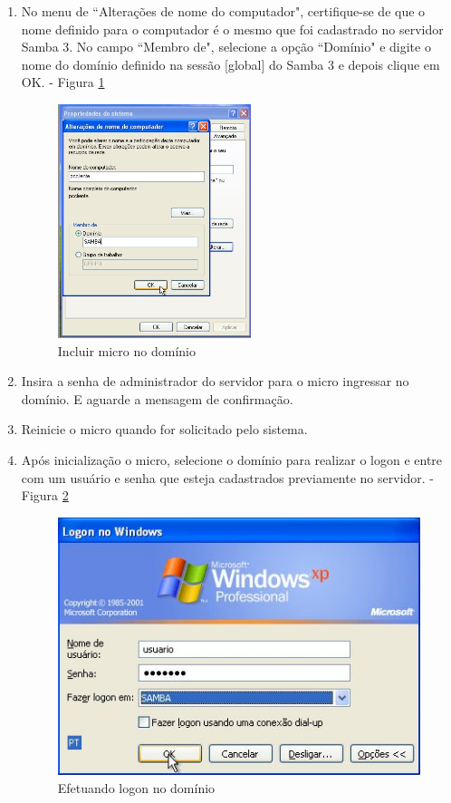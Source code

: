\begin{enumerate}
		\pagebreak 

	\item {No menu de ``Alterações de nome do computador", certifique-se de que o nome definido para o computador é o mesmo que foi cadastrado no servidor Samba 3. No campo ``Membro de", selecione a opção ``Domínio" e digite o nome do domínio definido na sessão [global] do Samba 3 e depois clique em OK. - Figura \ref{incluir_dominio}} 
			\begin{figure}[ht]
		   			\centering
		   		 	\includegraphics[width=0.7 \textwidth]{figuras/incluir_dominio}
		   			\caption{Incluir micro no domínio}
		    		\label{incluir_dominio}
			\end{figure}
	 
	
	\item {Insira a senha de administrador do servidor para o micro ingressar no domínio. E aguarde a mensagem de confirmação.} 
	
	\item {Reinicie o micro quando for solicitado pelo sistema.}

	\item {Após inicialização o micro, selecione o domínio para realizar o logon e entre com um usuário e senha que esteja cadastrados previamente no servidor. - Figura \ref{logon}}
	\begin{figure}[ht]
			\centering
	 		\includegraphics[width=0.7 \textwidth]{figuras/logon}
			\caption{Efetuando logon no domínio}
			\label{logon}
	\end{figure}


\end{enumerate}
